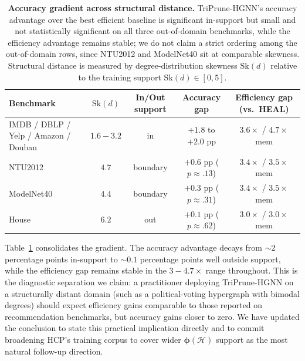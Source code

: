 \documentclass[10pt]{article}
\theoremstyle{plain}
\theoremstyle{definition}
\begin{document}
\begin{table}[ht!]
\centering
\caption{\textbf{Accuracy gradient across structural distance.} TriPrune-HGNN's accuracy advantage over the best efficient baseline is significant in-support but small and not statistically significant on all three out-of-domain benchmarks, while the efficiency advantage remains stable; we do not claim a strict ordering among the out-of-domain rows, since NTU2012 and ModelNet40 sit at comparable skewness. Structural distance is measured by degree-distribution skewness $\mathrm{Sk}(d)$ relative to the training support $\mathrm{Sk}(d)\!\in\![0,5]$.}
\label{tab:Eva_gradient}
\setlength{\tabcolsep}{5pt}
\renewcommand{\arraystretch}{1.15}
\tiny
\begin{tabular}{l c c c c}
\toprule
\textbf{Benchmark} & \textbf{$\mathrm{Sk}(d)$} & \textbf{In/Out support} & \textbf{Accuracy gap} & \textbf{Efficiency gap (vs.\ HEAL)} \\
\midrule
IMDB / DBLP / Yelp / Amazon / Douban
                  & $1.6\!-\!3.2$ & in       & $+1.8$ to $+2.0$ pp & $3.6\!\times$ / $4.7\!\times$ mem \\   
NTU2012           & $4.7$         & boundary & $+0.6$ pp ($p\!\approx\!.13$) & $3.4\!\times$ / $3.5\!\times$ mem \\
ModelNet40        & $4.4$         & boundary & $+0.3$ pp ($p\!\approx\!.31$) & $3.4\!\times$ / $3.5\!\times$ mem \\  
House             & $6.2$         & out      & $+0.1$ pp ($p\!\approx\!.62$) & $3.0\!\times$ / $3.0\!\times$ mem \\  
\bottomrule
\end{tabular}
\end{table}

Table~\ref{tab:Eva_gradient} consolidates the gradient. The accuracy advantage decays from $\sim\!2$ percentage points in-support to $\sim\!0.1$ percentage points well outside support, while the efficiency gap remains stable in the $3\!-\!4.7\!\times$ range throughout. This is the diagnostic separation we claim: a practitioner deploying TriPrune-HGNN on a structurally distant domain (such as a political-voting hypergraph with bimodal degrees) should expect efficiency gains comparable to those reported on recommendation benchmarks, but accuracy gains closer to zero. We have updated the conclusion to state this practical implication directly and to commit broadening HCP's training corpus to cover wider $\boldsymbol{\phi}(\mathcal{H})$ support as the most natural follow-up direction.
\end{document}
